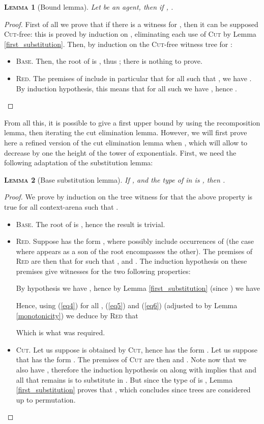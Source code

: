 \documentclass{article}
\newtheorem{lemma}{\textsc{Lemma}}
\begin{document}
\begin{lemma}[Bound lemma]
Let  be an agent, then if , .
\label{bound}
\end{lemma}
\begin{proof}
First of all we prove that if there is a witness for , then it can be supposed \textsc{Cut}-free: this is proved by induction on , eliminating
each use of \textsc{Cut} by Lemma \ref{first_substitution}. Then, by induction on the \textsc{Cut}-free witness tree for :
\begin{itemize}
\item \textsc{Base.} Then, the root of  is , thus ; there is nothing to prove.
\item \textsc{Red.} The premises of  include in particular that for all  such that , we have . By induction hypothesis, this
means that for all such  we have , hence .
\end{itemize}
\end{proof}

From all this, it is possible to give a first upper bound by using the recomposition lemma, then iterating the cut elimination lemma. However, we will first prove here a refined version of the
cut elimination lemma when , which will allow to decrease by one the height of the tower of exponentials. First, we need the following adaptation of the substitution lemma:

\begin{lemma}[Base substitution lemma]
If ,  and the type of  in  is , then .
\label{specialized_substitution}
\end{lemma}
\begin{proof}
We prove by induction on the tree witness for  that the above property is true for all context-arena  such that .
\begin{itemize}
\item \textsc{Base.} The root of  is , hence the result is trivial.
\item \textsc{Red.} Suppose  has the form , where  possibly include occurrences of  (the case where  appears as a son
of the root encompasses the other). The premises of \textsc{Red} are then that for  such that
, 
and . The induction hypothesis on these premises give witnesses for the two following properties:


By hypothesis we have , hence by Lemma \ref{first_substitution} (since ) we have

Hence, using (\ref{eq4}) for all , (\ref{eq5}) and (\ref{eq6}) (adjusted to  by Lemma \ref{monotonicity}) we deduce by \textsc{Red} that

Which is what was required.
\item \textsc{Cut.} Let us suppose  is obtained by \textsc{Cut}, hence  has the form . Let us suppose
that  has the form . The premises of \textsc{Cut} are then
 and . Note now that we also have , therefore
the induction hypothesis on  along with  implies that
 and all that remains is to substitute  in . But since the type of  is , Lemma \ref{first_substitution} proves
that , which concludes since trees are considered up to permutation.
\end{itemize}
\end{proof}
\end{document}

